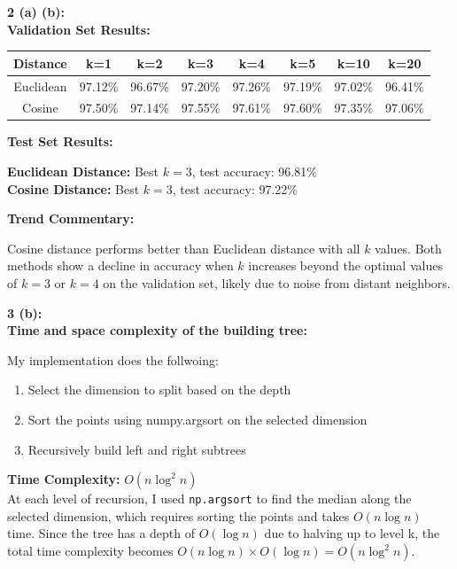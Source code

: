 \documentclass[12pt]{article}
\begin{document}
\textbf{2 (a) (b):}\\
\textbf{Validation Set Results:}
\begin{enumerate}

\begin{center}
\begin{tabular}{|c|c|c|c|c|c|c|c|}
\hline
\textbf{Distance} & \textbf{k=1} & \textbf{k=2} & \textbf{k=3} & \textbf{k=4} & \textbf{k=5} & \textbf{k=10} & \textbf{k=20} \\
\hline
Euclidean & 97.12\% & 96.67\% & 97.20\% & 97.26\% & 97.19\% & 97.02\% & 96.41\% \\
\hline
Cosine & 97.50\% & 97.14\% & 97.55\% & 97.61\% & 97.60\% & 97.35\% & 97.06\% \\
\hline
\end{tabular}
\end{center}

\end{enumerate}
\textbf{Test Set Results:}
\begin{enumerate}
\textbf{Euclidean Distance:} Best $k = 3$, test accuracy: 96.81\%\\

\textbf{Cosine Distance:} Best $k = 3$, test accuracy: 97.22\%
\end{enumerate}
\textbf{Trend Commentary:}
\begin{enumerate}
Cosine distance performs better than Euclidean distance with all $k$ values. Both methods show a decline in accuracy when $k$ increases beyond the optimal values of $k=3$ or $k=4$ on the validation set, likely due to noise from distant neighbors.
\end{enumerate}
\textbf{3 (b):}\\
\textbf{Time and space complexity of the building tree:}

My implementation does the follwoing:
\begin{enumerate}
\item Select the dimension to split based on the depth
\item Sort the points using {numpy.argsort} on the selected dimension
\item Recursively build left and right subtrees
\end{enumerate}

\textbf{Time Complexity:} $O(n \log^2 n)$\\
At each level of recursion, I used \texttt{np.argsort} to find the median along the selected dimension, which requires sorting the points and takes $O(n \log n)$ time. Since the tree has a depth of $O(\log n)$ due to halving up to level k, the total time complexity becomes $O(n \log n) \times O(\log n) = O(n \log^2 n)$.
\end{document}
